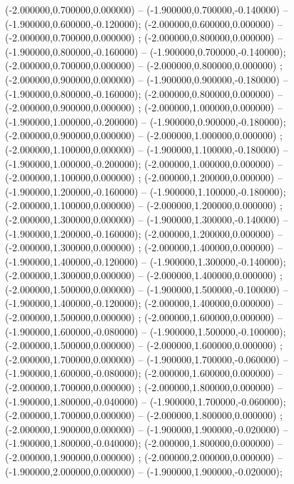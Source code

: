  (-2.000000,0.700000,0.000000) -- (-1.900000,0.700000,-0.140000) -- (-1.900000,0.600000,-0.120000);
 (-2.000000,0.600000,0.000000) -- (-2.000000,0.700000,0.000000) ;
 (-2.000000,0.800000,0.000000) -- (-1.900000,0.800000,-0.160000) -- (-1.900000,0.700000,-0.140000);
 (-2.000000,0.700000,0.000000) -- (-2.000000,0.800000,0.000000) ;
 (-2.000000,0.900000,0.000000) -- (-1.900000,0.900000,-0.180000) -- (-1.900000,0.800000,-0.160000);
 (-2.000000,0.800000,0.000000) -- (-2.000000,0.900000,0.000000) ;
 (-2.000000,1.000000,0.000000) -- (-1.900000,1.000000,-0.200000) -- (-1.900000,0.900000,-0.180000);
 (-2.000000,0.900000,0.000000) -- (-2.000000,1.000000,0.000000) ;
 (-2.000000,1.100000,0.000000) -- (-1.900000,1.100000,-0.180000) -- (-1.900000,1.000000,-0.200000);
 (-2.000000,1.000000,0.000000) -- (-2.000000,1.100000,0.000000) ;
 (-2.000000,1.200000,0.000000) -- (-1.900000,1.200000,-0.160000) -- (-1.900000,1.100000,-0.180000);
 (-2.000000,1.100000,0.000000) -- (-2.000000,1.200000,0.000000) ;
 (-2.000000,1.300000,0.000000) -- (-1.900000,1.300000,-0.140000) -- (-1.900000,1.200000,-0.160000);
 (-2.000000,1.200000,0.000000) -- (-2.000000,1.300000,0.000000) ;
 (-2.000000,1.400000,0.000000) -- (-1.900000,1.400000,-0.120000) -- (-1.900000,1.300000,-0.140000);
 (-2.000000,1.300000,0.000000) -- (-2.000000,1.400000,0.000000) ;
 (-2.000000,1.500000,0.000000) -- (-1.900000,1.500000,-0.100000) -- (-1.900000,1.400000,-0.120000);
 (-2.000000,1.400000,0.000000) -- (-2.000000,1.500000,0.000000) ;
 (-2.000000,1.600000,0.000000) -- (-1.900000,1.600000,-0.080000) -- (-1.900000,1.500000,-0.100000);
 (-2.000000,1.500000,0.000000) -- (-2.000000,1.600000,0.000000) ;
 (-2.000000,1.700000,0.000000) -- (-1.900000,1.700000,-0.060000) -- (-1.900000,1.600000,-0.080000);
 (-2.000000,1.600000,0.000000) -- (-2.000000,1.700000,0.000000) ;
 (-2.000000,1.800000,0.000000) -- (-1.900000,1.800000,-0.040000) -- (-1.900000,1.700000,-0.060000);
 (-2.000000,1.700000,0.000000) -- (-2.000000,1.800000,0.000000) ;
 (-2.000000,1.900000,0.000000) -- (-1.900000,1.900000,-0.020000) -- (-1.900000,1.800000,-0.040000);
 (-2.000000,1.800000,0.000000) -- (-2.000000,1.900000,0.000000) ;
 (-2.000000,2.000000,0.000000) -- (-1.900000,2.000000,0.000000) -- (-1.900000,1.900000,-0.020000);
